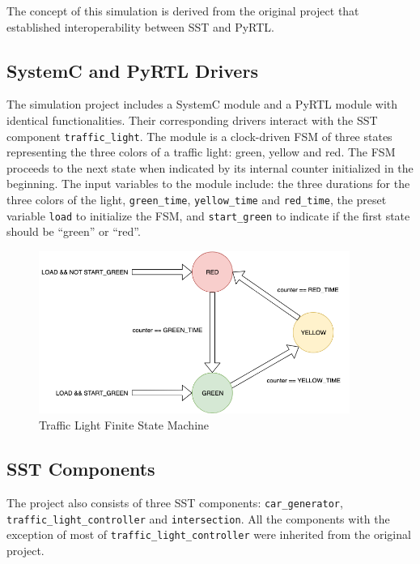 \documentclass{article}
\begin{document}
  The concept of this simulation is derived from the original project that established
  interoperability between SST and PyRTL. \cite{pyrtl-sst}

    \subsection{SystemC and PyRTL Drivers}
    The simulation project includes a SystemC module and a PyRTL module with identical
    functionalities. Their corresponding drivers interact with the SST component
    \lstinline{traffic_light}. The module is a clock-driven FSM of three states representing the
    three colors of a traffic light: green, yellow and red. The FSM proceeds to the next state when
    indicated by its internal counter initialized in the beginning. The input variables to the
    module include: the three durations for the three colors of the light, \lstinline{green_time},
    \lstinline{yellow_time} and \lstinline{red_time}, the preset variable \lstinline{load} to
    initialize the FSM, and \lstinline{start_green} to indicate if the first state should be
    ``green'' or ``red''.

    \begin{figure}[!h]
      \centering
      \includegraphics[width=4in]{diagrams/fsm.png}
      \caption{Traffic Light Finite State Machine}
      \label{fig:fsm}
    \end{figure}

    \subsection{SST Components}
    The project also consists of three SST components: \lstinline{car_generator},
    \lstinline{traffic_light_controller} and \lstinline{intersection}. All the components with the
    exception of most of \lstinline{traffic_light_controller} were inherited from the original
    project.
\end{document}
